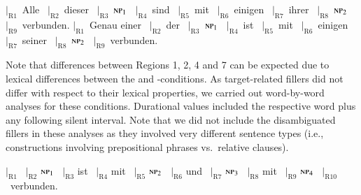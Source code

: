 \documentclass[fleqn,reqno,10pt,draft]{article}
\newcommand{\as}{\acro{as}}
\renewcommand{\es}{\acro{es}}
\begin{document}
\begin{exe}
  \ex
    \begin{xlist}
      \ex $|_{\text{R}1}$~Alle  	\ $|_{\text{R}2}$~dieser 
      \ $|_{\text{R}3}$~$\textsc{np}_1$  
      \ $|_{\text{R}4}$~sind  \ $|_{\text{R}5}$~mit  \
      $|_{\text{R}6}$~einigen  \ $|_{\text{R}7}$~ihrer 
       \ $|_{\text{R}8}$~{$\textsc{np}_2$}  \ $|_{\text{R}9}$~verbunden.
    \ex       $|_{\text{R}1}$~Genau einer  	\ $|_{\text{R}2}$~der 
      \ $|_{\text{R}3}$~$\textsc{np}_1$  
      \ $|_{\text{R}4}$~ist  \ $|_{\text{R}5}$~mit  \
      $|_{\text{R}6}$~einigen  \ $|_{\text{R}7}$~seiner 
       \ $|_{\text{R}8}$~{$\textsc{np}_2$}  \ $|_{\text{R}9}$~verbunden.
    \end{xlist}
\end{exe}

Note that differences between Regions 1, 2, 4 and 7 can be expected
due to lexical differences between the \as and \es-conditions. As
target-related fillers did not differ with respect to their lexical
properties, we carried out word-by-word analyses for these
conditions. Durational values included the respective word plus any
following silent interval. Note that we did not include the
disambiguated fillers in these analyses as they involved very
different sentence types (i.e., constructions involving prepositional
phrases vs.~relative clauses).

\begin{exe}
  \ex $|_{\text{R}1}$   	\ $|_{\text{R}2}$ $\textsc{np}_1$
      \ $|_{\text{R}3}$ ist 
      \ $|_{\text{R}4}$ mit  \ $|_{\text{R}5}$ $\textsc{np}_2$   \
      $|_{\text{R}6}$ und  \ $|_{\text{R}7}$ $\textsc{np}_3$ 
       \ $|_{\text{R}8}$  mit  \ $|_{\text{R}9}$ $\textsc{np}_4$ \ $|_{\text{R}10}$~verbunden.
\end{exe}
\end{document}
